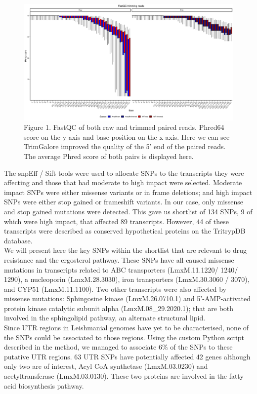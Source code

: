 \documentclass{bioinfo}
\begin{document}
\begin{figure}[ht]
\center
\includegraphics[width=\textwidth]{"Fastqc trimming.pdf"}
\caption{\label{schema}Figure 1. FastQC of both raw and trimmed paired reads. Phred64 score on the y-axis and base position on the x-axis. Here we can see TrimGalore improved the quality of the 5' end of the paired reads. The average Phred score of both pairs is displayed here.}
\end{figure}

The snpEff / Sift tools were used to allocate SNPs to the transcripts
they were affecting and those that had moderate to high impact were
selected. Moderate impact SNPs were either missense variants or in frame
deletions; and high impact SNPs were either stop gained or frameshift
variants. In our case, only missense and stop gained mutations were
detected. This gave us shortlist of 134 SNPs, 9 of which were high
impact, that affected 89 transcripts. However, 44 of these transcripts
were described as conserved hypothetical proteins on the TritrypDB
database.\\

We will present here the key SNPs within the shortlist that are relevant
to drug resistance and the ergosterol pathway. These SNPs have all
caused missense mutations in transcripts related to ABC transporters
(LmxM.11.1220/ 1240/ 1290), a nucleoporin (LmxM.28.3030), iron
transporters (LmxM.30.3060 / 3070), and CYP51 (LmxM.11.1100). Two other
transcripts were also affected by missense mutations: Sphingosine kinase
(LmxM.26.0710.1) and 5'-AMP-activated protein kinase catalytic subunit
alpha (LmxM.08\_29.2020.1); that are both involved in the sphingolipid
pathway, an alternate structural lipid.\\

Since UTR regions in Leishmanial genomes have yet to be characterised,
none of the SNPs could be associated to those regions. Using the custom
Python script described in the method, we managed to associate 6\% of
the SNPs to these putative UTR regions. 63 UTR SNPs have potentially
affected 42 genes although only two are of interest, Acyl CoA synthetase
(LmxM.03.0230) and acetyltransferase (LmxM.03.0130). These two proteins
are involved in the fatty acid biosynthesis pathway.
\end{document}
